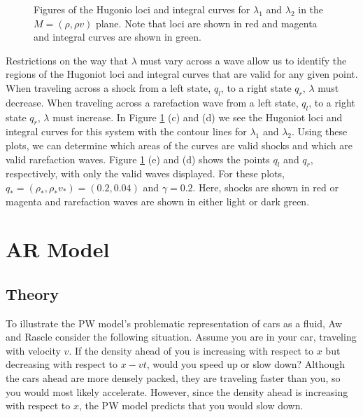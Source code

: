 \documentclass{article}
\begin{document}
\begin{figure}[H]
{   }
 \caption[Optional caption for list of figures]
 {Figures of the Hugonio loci and integral curves for $\lambda_1$ and $\lambda_2$ in the $M = (\rho, \rho v)$ plane. Note that loci are shown in red and magenta and integral curves are shown in green.}
  \label{fig:PW_curves}
\end{figure}

Restrictions on the way that $\lambda$ must vary across a wave allow us to identify the regions of the Hugoniot loci and integral curves that are valid for any given point. When traveling across a shock from a left state, $q_l$, to a right state $q_r$, $\lambda$ must decrease. When traveling across a rarefaction wave from a left state, $q_l$, to a right state $q_r$, $\lambda$ must increase. In Figure \ref{fig:PW_curves} (c) and (d) we see the Hugoniot loci and integral curves for this system with the contour lines for $\lambda_1$ and $\lambda_2$. Using these plots, we can determine which areas of the curves are valid shocks and which are valid rarefaction waves. Figure \ref{fig:PW_curves} (e) and (d) shows the points $q_l$ and $q_r$, respectively, with only the valid waves displayed. For these plots,
$q_* = (\rho_*,\rho_*v_*) = (0.2, 0.04)$ and $\gamma = 0.2$. 
Here, shocks are shown in red or magenta and rarefaction waves are shown in either light or dark green.

\section{AR Model}

\subsection{Theory}
To illustrate the PW model's problematic representation of cars as a fluid, Aw and Rascle \cite{AwRascle2000} consider the following situation.  Assume you are in your car, traveling with velocity $v$.  If the density ahead of you is increasing with respect to $x$ but decreasing with respect to $x - vt$, would you speed up or slow down?  Although the cars ahead are more densely packed, they are traveling faster than you, so you would most likely accelerate.  However, since the density ahead is increasing with respect to $x$, the PW model predicts that you would slow down.  
\end{document}
